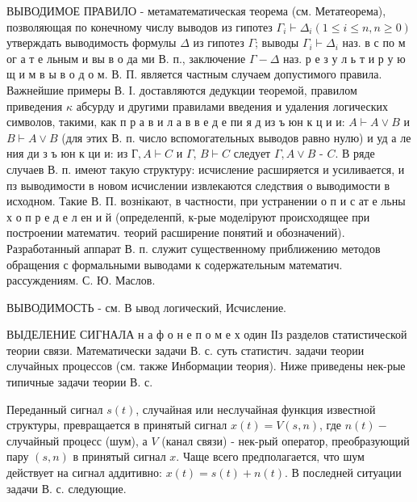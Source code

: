 \documentclass[10pt]{article}
\begin{document}
ВЫВОДИМОЕ ПРАВИЛО - метаматематическая теорема (см. Метатеорема), позволяющая по конечному числу выводов из гипотез $\Gamma_{i} \vdash \Delta_{i}(1 \leqslant i \leqslant n, n \geqslant 0)$ утверждать выводимость формулы $\Delta$ из гипотез $\Gamma$; выводы $\Gamma_{i} \vdash \Delta_{i}$ наз. в с по м ог а т е льным и вы в о да ми В. п., заключение $\Gamma-\Delta$ наз. р е з у л ь т и р у ю щ и м в ы в о д о м. В. П. является частным случаем допустимого правила. Важнейшие примеры В. І. доставляются дедукции теоремой, правилом приведения $\kappa$ абсурду и другими правилами введения и удаления логических символов, такими, как п р а в и л а в в е д е пи я д из ъ юн к ц и и: $A \vdash A \vee B$ и $B \vdash A \vee B$ (для этих В. п. число вспомогательных выводов равно нулю) и уд а ле ния ди з ъ юн к ци и: из $Г, A \vdash C$ и $\Gamma$, $B \vdash C$ следует $\Gamma, A \vee B$ - $C$. В ряде случаев В. п. имеют такую структуру: исчисление расширяется и усиливается, и пз выводимости в новом исчислении извлекаются следствия о выводимости в исходном. Такие В. П. вознікают, в частности, при устранении о п и с ат е льны х о п р е д е л ен и й (определенпй, к-рые моделіруют происходящее при построении математич. теорий расширение понятий и обозначений). Разработанный аппарат В. п. служит существенному приближению методов обращения с формальными выводами к содержательным математич. рассуждениям. С. Ю. Маслов.



ВЫВОДИМОСТЬ - см. В ывод логический, Исчисление.



ВЫДЕЛЕНИЕ СИГНАЛА н а ф о н е п о м е х один ІІз разделов статистической теории связи. Математически задачи В. с. суть статистич. задачи теории случайных процессов (см. также Инбормации теория). Ниже приведены нек-рые типичные задачи теории В. с.



Переданный сигнал $s(t)$, случайная или неслучайная функция известной структуры, превращается в принятый сигнал $x(t)=V(s, n)$, где $n(t)-$ случайный процесс (шум), а $V$ (канал связи) - нек-рый оператор, преобразующий пару $(s, n)$ в принятый сигнал $x$. Чаще всего предполагается, что шум действует на сигнал аддитивно: $x(t)=s(t)+n(t)$. В последней ситуации задачи В. с. следующие.
\end{document}
